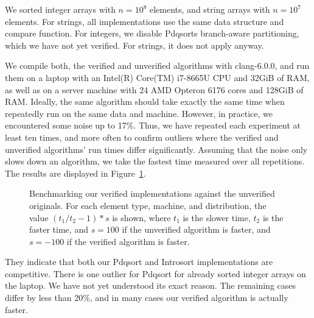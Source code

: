 \documentclass[runningheads]{llncs}
\begin{document}
{  We sorted integer arrays with $n=10^8$ elements, and string arrays with $n=10^7$ elements.
  For strings, all implementations use the same data structure and compare function.
  For integers, we disable Pdqsorts branch-aware partitioning, which we have not yet verified.
  For strings, it does not apply anyway.


  We compile both, the verified and unverified algorithms with clang-6.0.0, and run them on a laptop with an Intel(R) Core(TM) i7-8665U CPU and 32GiB of RAM,
  as well as on a server machine with 24 AMD Opteron 6176 cores and 128GiB of RAM.
  Ideally, the same algorithm should take exactly the same time when repeatedly run on the same data and machine. However, in practice,
  we encountered some noise up to 17\%. Thus, we have repeated each experiment at least ten times, and more often to confirm outliers
  where the verified and unverified algorithms' run times differ significantly. Assuming that the noise only slows down an algorithm,
  we take the fastest time measured over all repetitions.
  The results are displayed in Figure~\ref{fig:benchres}.
  \begin{figure}
  \plotpdqsort
  \plotintrosort
  \caption{Benchmarking our verified implementations against the unverified originals.
    For each element type, machine, and distribution, the value $(t_1/t_2-1)*s$ is shown,
    where $t_1$ is the slower time, $t_2$ is the faster time, and $s = 100$ if the unverified algorithm is faster,
    and $s=-100$ if the verified algorithm is faster.
  }\label{fig:benchres}
  \end{figure}

%
  They indicate that both our Pdqsort and Introsort implementations are competitive.
  There is one outlier for Pdqsort for already sorted integer arrays on the laptop. We have not yet understood its exact reason.
  The remaining cases differ by less than 20\%, and in many cases our verified algorithm is actually faster.



}
\end{document}
